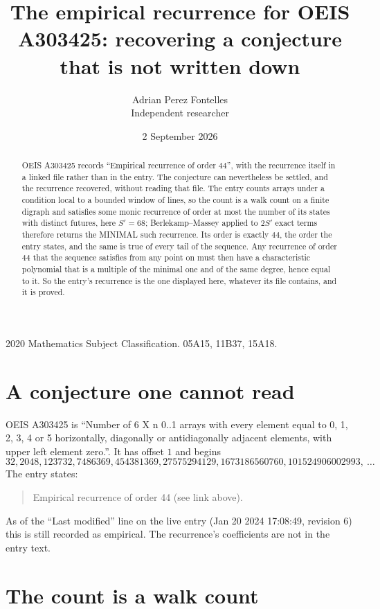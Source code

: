 \documentclass[11pt,a4paper]{article}
\title{The empirical recurrence for OEIS A303425: recovering a conjecture that is not written down}
\author{Adrian Perez Fontelles\\ \small Independent researcher}
\date{2 September 2026}
\theoremstyle{plain}
\theoremstyle{definition}
\begin{document}
\maketitle

\begin{abstract}
OEIS A303425 records ``Empirical recurrence of order $44$'', with the recurrence itself in a
linked file rather than in the entry. The conjecture can nevertheless be settled, and the
recurrence recovered, without reading that file. The entry counts arrays under a condition
local to a bounded window of lines, so the count is a walk count on a finite digraph and
satisfies some monic recurrence of order at most the number of its states with distinct
futures, here $S'=68$; Berlekamp--Massey applied to $2S'$ exact
terms therefore returns the MINIMAL such recurrence. Its order is exactly $44$, the order
the entry states, and the same is true of every tail of the sequence. Any recurrence of order
$44$ that the sequence satisfies from any point on must then have a characteristic
polynomial that is a multiple of the minimal one and of the same degree, hence equal to it. So
the entry's recurrence is the one displayed here, whatever its file contains, and it is
proved.
\end{abstract}

\noindent\small 2020 Mathematics Subject Classification. 05A15, 11B37, 15A18.\normalsize

\section{A conjecture one cannot read}

OEIS A303425 is ``Number of 6 X n 0..1 arrays with every element equal to 0, 1, 2, 3, 4 or 5 horizontally, diagonally or antidiagonally adjacent elements, with upper left element zero.''. It has offset $1$ and begins
\[
32, 2048, 123732, 7486369, 454381369, 27575294129, 1673186560760, 101524906002993,\ \dots
\]
The entry states:
\begin{quote}
Empirical recurrence of order 44 (see link above).
\end{quote}
As of the ``Last modified'' line on the live entry (Jan 20 2024 17:08:49, revision 6) this is still
recorded as empirical. The recurrence's coefficients are not in the entry text.

\section{The count is a walk count}
\end{document}
